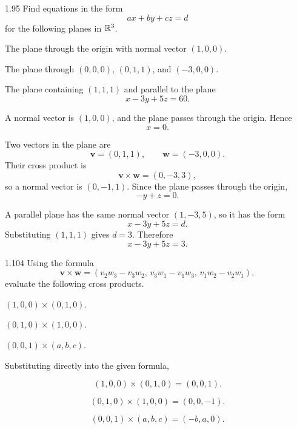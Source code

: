 \documentclass[11pt,oneside]{article}
\begin{document}
\begin{problem}{1.95}
Find equations in the form
\[
    ax+by+cz=d
\]
for the following planes in $\mathbb{R}^3$.
\begin{problemsubparts}
    \item The plane through the origin with normal vector $(1,0,0)$.
    \item The plane through $(0,0,0)$, $(0,1,1)$, and $(-3,0,0)$.
    \item The plane containing $(1,1,1)$ and parallel to the plane
    \[
        x-3y+5z=60.
    \]
\end{problemsubparts}
\end{problem}

\begin{solution}
\begin{problemsubparts}
    \item A normal vector is $(1,0,0)$, and the plane passes through the origin. Hence
    \[
        \boxed{x=0}.
    \]

    \item Two vectors in the plane are
    \[
        \mathbf v=(0,1,1),
        \qquad
        \mathbf w=(-3,0,0).
    \]
    Their cross product is
    \[
        \mathbf v\times\mathbf w=(0,-3,3),
    \]
    so a normal vector is $(0,-1,1)$. Since the plane passes through the origin,
    \[
        \boxed{-y+z=0}.
    \]

    \item A parallel plane has the same normal vector $(1,-3,5)$, so it has the form
    \[
        x-3y+5z=d.
    \]
    Substituting $(1,1,1)$ gives $d=3$. Therefore
    \[
        \boxed{x-3y+5z=3}.
    \]
\end{problemsubparts}
\end{solution}

\begin{problem}{1.104}
Using the formula
\[
    \mathbf v\times\mathbf w
    =(v_2w_3-v_3w_2,\,v_3w_1-v_1w_3,\,v_1w_2-v_2w_1),
\]
evaluate the following cross products.
\begin{problemsubparts}
    \item $(1,0,0)\times(0,1,0)$.
    \item $(0,1,0)\times(1,0,0)$.
    \item $(0,0,1)\times(a,b,c)$.
\end{problemsubparts}
\end{problem}

\begin{solution}
Substituting directly into the given formula,
\begin{problemsubparts}
    \item
    \[
        \boxed{(1,0,0)\times(0,1,0)=(0,0,1)}.
    \]
    \item
    \[
        \boxed{(0,1,0)\times(1,0,0)=(0,0,-1)}.
    \]
    \item
    \[
        \boxed{(0,0,1)\times(a,b,c)=(-b,a,0)}.
    \]
\end{problemsubparts}
\end{solution}
\end{document}
